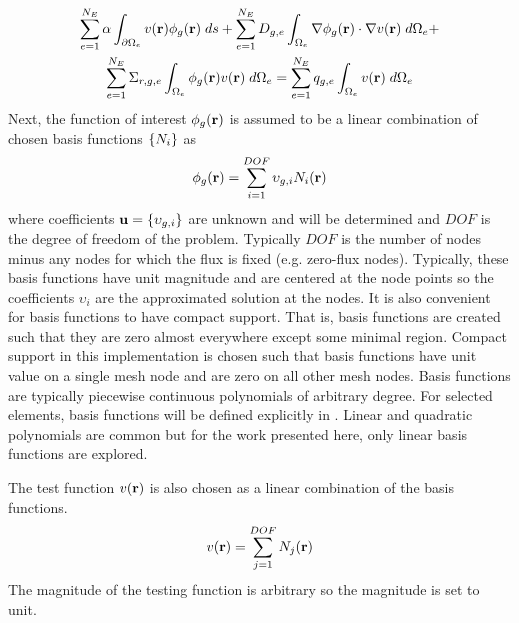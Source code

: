     \begin{multline}
      \label{eq:element_boundary}
      \sum_{e=1}^{N_E} \alpha \int_{\partial \Omega_e} v(\mathbf{r}) 
        \phi_g(\mathbf{r}) \;ds + \sum_{e=1}^{N_E} D_{g,e}
        \int_{\Omega_e} \mathbf{\nabla} \phi_g(\mathbf{r}) \cdot \mathbf{\nabla} v(\mathbf{r}) \; d\Omega_e + \\
        \sum_{e=1}^{N_E} \Sigma_{r,g,e} \int_{\Omega_e} \phi_g(\mathbf{r}) v(\mathbf{r}) 
        \; d\Omega_e =
        \sum_{e=1}^{N_E} q_{g,e} \int_{\Omega_e} v(\mathbf{r}) \; d\Omega_e
    \end{multline}
    Next, the function of interest $\phi_g(\mathbf{r})$ is assumed to be a linear 
    combination of chosen basis functions $\{N_i\}$ as
    \begin{equation} \label{eq:linear_combination}
      \phi_g(\mathbf{r}) = \sum_{i=1}^{DOF} \upsilon_{g,i} N_i(\mathbf{r})
    \end{equation}
    where coefficients $\mathbf{u} = \{\upsilon_{g,i}\}$ are unknown and will be 
    determined and $DOF$ is the degree of freedom of the problem. Typically 
    $DOF$ is the number of nodes minus any nodes for which the flux is fixed 
    (e.g. zero-flux nodes).  Typically, these basis functions have unit 
    magnitude and are centered at the node  points so the coefficients 
    $\upsilon_i$ are the approximated solution at the nodes. It is also 
    convenient for basis functions to have compact support. That is, basis 
    functions are created such that they are zero almost everywhere except some
    minimal region. Compact support in this implementation is chosen such that
    basis functions have unit value on a single mesh node and are zero on all
    other mesh nodes. Basis functions are typically piecewise continuous 
    polynomials of arbitrary degree. For selected elements, basis functions will
    be defined explicitly in .  Linear and quadratic
    polynomials are common but for the work presented here, only linear
    basis functions are explored.

    The test function $v(\mathbf{r})$ is also chosen as a linear combination of the 
    basis functions.
    \begin{equation} \label{eq:linear_superposition}
      v(\mathbf{r}) = \sum_{j=1}^{DOF} N_j(\mathbf{r})
    \end{equation}
    The magnitude of the testing function is arbitrary so the magnitude is set
    to unit.
    

